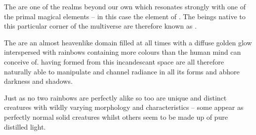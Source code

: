 {
	The  are one of the realms beyond our own which resonates strongly with one of the primal magical elements – in this case the element of . The beings native to this particular corner of the multiverse are therefore known as . 

The  are an almost heaven\minus{}like domain\comma{} filled at all times with a diffuse\comma{} golden glow\comma{} interspersed with rainbows containing more colours than the human mind can conceive of. \comma{} having formed from this incandescant space\comma{} are all therefore naturally able to manipulate and channel radiance in all its forms\comma{} and abhore darkness and shadows. 

Just as no two rainbows are perfectly alike\comma{} so too are  unique and distinct creatures\comma{} with wildly varying morphology and characteristics – some appear as perfectly normal solid creatures\comma{} whilst others seem to be made up of pure\comma{} distilled light.
}
